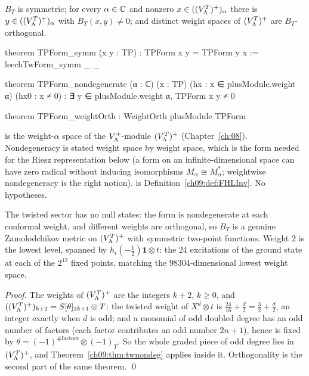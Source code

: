 \begin{theorem}\label{ch09:thm:TPForm}
$B_T$ is symmetric; for every $\alpha\in{\mathbb{C}}$ and nonzero $x\in((V_{\Lambda}^{T})^{+})_\alpha$ there is
$y\in((V_{\Lambda}^{T})^{+})_\alpha$ with $B_T(x,y)\neq0$; and distinct weight spaces of $(V_{\Lambda}^{T})^{+}$ are
$B_T$-orthogonal.
\end{theorem}
\begin{leancode}
theorem TPForm_symm (x y : TP) : TPForm x y = TPForm y x := leechTwForm_symm _ _

theorem TPForm_nondegenerate (α : ℂ) (x : TP) (hx : x ∈ plusModule.weight α) (hx0 : x ≠ 0) :
    ∃ y ∈ plusModule.weight α, TPForm x y ≠ 0

theorem TPForm_weightOrth : WeightOrth plusModule TPForm
\end{leancode}
\begin{dictionary}
 is the weight-$\alpha$ space of the $V_{\Lambda}^{+}$-module $(V_{\Lambda}^{T})^{+}$
(Chapter~\ref{ch:08}). Nondegeneracy is stated weight space by weight space, which is the form
needed for the Riesz representation below (a form on an infinite-dimensional space can have zero
radical without inducing isomorphisms $M_\alpha\cong M_\alpha^*$; weightwise nondegeneracy is the
right notion).  is Definition~\ref{ch09:def:FHLInv}. No hypotheses.
\end{dictionary}
\begin{physics}
The twisted sector has no null states: the form is nondegenerate at each conformal weight, and different weights are orthogonal, so $B_T$ is a genuine Zamolodchikov metric on $(V_{\Lambda}^{T})^{+}$ with symmetric two-point functions. Weight $2$ is the lowest level, spanned by $h_i(-\tfrac12)\mathbf1\otimes t$: the 24 excitations of the ground state at each of the $2^{12}$ fixed points, matching the $98304$-dimensional lowest weight space.
\end{physics}

\noindent\emph{Proof.} The weights of $(V_{\Lambda}^{T})^{+}$ are the integers $k+2$, $k\ge0$, and
$((V_{\Lambda}^{T})^{+})_{k+2}=S[\theta]_{2k+1}\otimes T$: the twisted weight of $X^d\otimes t$ is
$\frac{24}{16}+\frac d2=\frac32+\frac d2$, an integer exactly when $d$ is odd; and a monomial of odd
doubled degree has an odd number of factors (each factor contributes an odd number $2n+1$), hence
is fixed by $\theta=(-1)^{\#\text{factors}}\otimes(-1)_T$. So the whole graded piece of odd degree
lies in $(V_{\Lambda}^{T})^{+}$, and Theorem~\ref{ch09:thm:twnondeg} applies inside it. Orthogonality is the
second part of the same theorem. \qed

